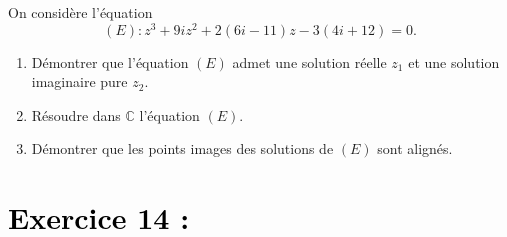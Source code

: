 \documentclass[12pt]{article}
\begin{document}
On considère l’équation 
\[
(E) : z^3 + 9iz^2 + 2(6i - 11)z - 3(4i + 12) = 0.
\]

\begin{enumerate}
    \item Démontrer que l’équation $(E)$ admet une solution réelle $z_1$ et une solution imaginaire pure $z_2$.

    \item Résoudre dans $\mathbb{C}$ l’équation $(E)$.

    \item Démontrer que les points images des solutions de $(E)$ sont alignés.
\end{enumerate}

\section*{\textcolor{black}{Exercice 14 :}}
\end{document}
